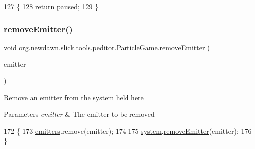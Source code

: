 \begin{DoxyCode}
127                               \{
128         \textcolor{keywordflow}{return} \mbox{\hyperlink{classorg_1_1newdawn_1_1slick_1_1tools_1_1peditor_1_1_particle_game_a5023ac0e8141513700ff26420c592211}{paused}};
129     \}
\end{DoxyCode}
\mbox{\label{classorg_1_1newdawn_1_1slick_1_1tools_1_1peditor_1_1_particle_game_a078d9da755f34a15c0a57e5fd3442e35}} 
\subsubsection{\texorpdfstring{remove\+Emitter()}{removeEmitter()}}
{\footnotesize\ttfamily void org.\+newdawn.\+slick.\+tools.\+peditor.\+Particle\+Game.\+remove\+Emitter (\begin{DoxyParamCaption}\item[{\mbox{\hyperlink{classorg_1_1newdawn_1_1slick_1_1particles_1_1_configurable_emitter}{Configurable\+Emitter}}}]{emitter }\end{DoxyParamCaption})\hspace{0.3cm}{\ttfamily [inline]}}

Remove an emitter from the system held here


\begin{DoxyParams}{Parameters}
{\em emitter} & The emitter to be removed \\
\hline
\end{DoxyParams}

\begin{DoxyCode}
172                                                            \{
173         \mbox{\hyperlink{classorg_1_1newdawn_1_1slick_1_1tools_1_1peditor_1_1_particle_game_a85dc9d5055b69f5a7ade60036db5d668}{emitters}}.remove(emitter);
174 
175         \mbox{\hyperlink{classorg_1_1newdawn_1_1slick_1_1tools_1_1peditor_1_1_particle_game_a3a6d42e312039ae4f175e6751256f2f7}{system}}.\mbox{\hyperlink{classorg_1_1newdawn_1_1slick_1_1particles_1_1_particle_system_a3c9ae5911ddadcb0436e5f858c6ecc43}{removeEmitter}}(emitter);
176     \}
\end{DoxyCode}
\mbox{\label{classorg_1_1newdawn_1_1slick_1_1tools_1_1peditor_1_1_particle_game_a36b19314b15adc03c946731dc3604acd}} 
